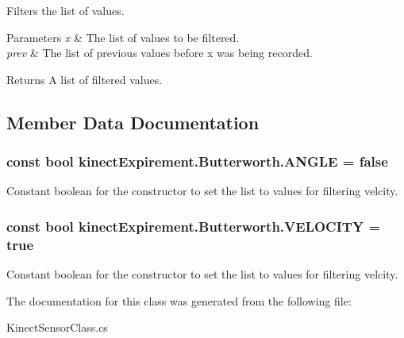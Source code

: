 Filters the list of values. 


\begin{DoxyParams}{Parameters}
{\em x} & The list of values to be filtered. \\
\hline
{\em prev} & The list of previous values before {\ttfamily x} was being recorded. \\
\hline
\end{DoxyParams}
\begin{DoxyReturn}{Returns}
A list of filtered values. 
\end{DoxyReturn}


\subsection{Member Data Documentation}
\subsubsection[{\texorpdfstring{A\+N\+G\+LE}{ANGLE}}]{\setlength{\rightskip}{0pt plus 5cm}const bool kinect\+Expirement.\+Butterworth.\+A\+N\+G\+LE = false}\hypertarget{classkinect_expirement_1_1_butterworth_ac991123445c654cb0da7d7841e313b2c}{}\label{classkinect_expirement_1_1_butterworth_ac991123445c654cb0da7d7841e313b2c}


Constant boolean for the constructor to set the list to values for filtering velcity. 

\subsubsection[{\texorpdfstring{V\+E\+L\+O\+C\+I\+TY}{VELOCITY}}]{\setlength{\rightskip}{0pt plus 5cm}const bool kinect\+Expirement.\+Butterworth.\+V\+E\+L\+O\+C\+I\+TY = true}\hypertarget{classkinect_expirement_1_1_butterworth_afc717929ffc8d554b7e0263e2b06806a}{}\label{classkinect_expirement_1_1_butterworth_afc717929ffc8d554b7e0263e2b06806a}


Constant boolean for the constructor to set the list to values for filtering velcity. 



The documentation for this class was generated from the following file\+:\begin{DoxyCompactItemize}
\item 
Kinect\+Sensor\+Class.\+cs\end{DoxyCompactItemize}
